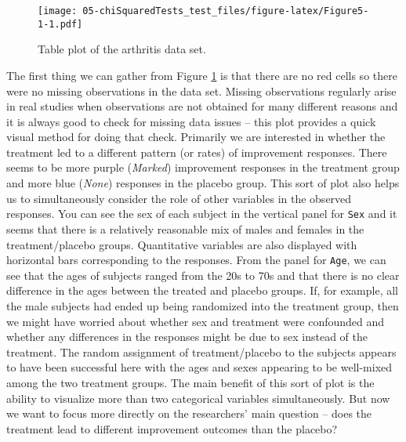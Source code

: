 \documentclass[]{book}
\theoremstyle{definition}
\theoremstyle{definition}
\theoremstyle{remark}
\begin{document}
\begin{figure}
\centering
\texttt{[image: 05-chiSquaredTests\_test\_files/figure-latex/Figure5-1-1.pdf]}
\caption{\label{fig:Figure5-1}Table plot of the arthritis data set.}
\end{figure}

The first thing we can gather from Figure \ref{fig:Figure5-1} is that
there are no red cells so there were no missing observations in the data
set. Missing observations regularly arise in real studies when
observations are not obtained for many different reasons and it is
always good to check for missing data issues -- this plot provides a
quick visual method for doing that check. Primarily we are interested in
whether the treatment led to a different pattern (or rates) of
improvement responses. There seems to be more purple (\emph{Marked})
improvement responses in the treatment group and more blue (\emph{None})
responses in the placebo group. This sort of plot also helps us to
simultaneously consider the role of other variables in the observed
responses. You can see the sex of each subject in the vertical panel for
\texttt{Sex} and it seems that there is a relatively reasonable mix of
males and females in the treatment/placebo groups. Quantitative
variables are also displayed with horizontal bars corresponding to the
responses. From the panel for \texttt{Age}, we can see that the ages of
subjects ranged from the 20s to 70s and that there is no clear
difference in the ages between the treated and placebo groups. If, for
example, all the male subjects had ended up being randomized into the
treatment group, then we might have worried about whether sex and
treatment were confounded and whether any differences in the responses
might be due to sex instead of the treatment. The random assignment of
treatment/placebo to the subjects appears to have been successful here
with the ages and sexes appearing to be well-mixed among the two
treatment groups. The main benefit of this sort of plot is the ability
to visualize more than two categorical variables simultaneously. But now
we want to focus more directly on the researchers' main question -- does
the treatment lead to different improvement outcomes than the placebo?
\end{document}
